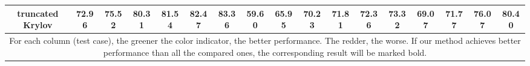 \begin{table*}[htbp]
\begin{tabular}{c|cccccc|cccccc|cccc}
    \textbf{truncated Krylov} & \cellcolor[rgb]{ .388,  .745,  .482}\textbf{72.96} & \cellcolor[rgb]{ .388,  .745,  .482}\textbf{75.52} & \cellcolor[rgb]{ .388,  .745,  .482}\textbf{80.31} & \cellcolor[rgb]{ .388,  .745,  .482}\textbf{81.54} & \cellcolor[rgb]{ .388,  .745,  .482}\textbf{82.47} & \cellcolor[rgb]{ .388,  .745,  .482}\textbf{83.36} & \cellcolor[rgb]{ .388,  .745,  .482}\textbf{59.60} & \cellcolor[rgb]{ .388,  .745,  .482}\textbf{65.95} & \cellcolor[rgb]{ .388,  .745,  .482}\textbf{70.23} & \cellcolor[rgb]{ .388,  .745,  .482}\textbf{71.81} & \cellcolor[rgb]{ .388,  .745,  .482}\textbf{72.36} & \cellcolor[rgb]{ .388,  .745,  .482}\textbf{73.32} & \cellcolor[rgb]{ .388,  .745,  .482}\textbf{69.07} & \cellcolor[rgb]{ .388,  .745,  .482}\textbf{71.77} & \cellcolor[rgb]{ .388,  .745,  .482}\textbf{76.07} & \cellcolor[rgb]{ .388,  .745,  .482}\textbf{80.40} \\
    \bottomrule
    \bottomrule
    \multicolumn{17}{m{0.95\textwidth}}{\small For each column (test case), the greener the color indicator, the better performance. The redder, the worse. If our method achieves better performance than all the compared ones, the corresponding result will be marked bold.}
    \end{tabular}%
\label{tab:results_no_validation}%
\end{table*}%
